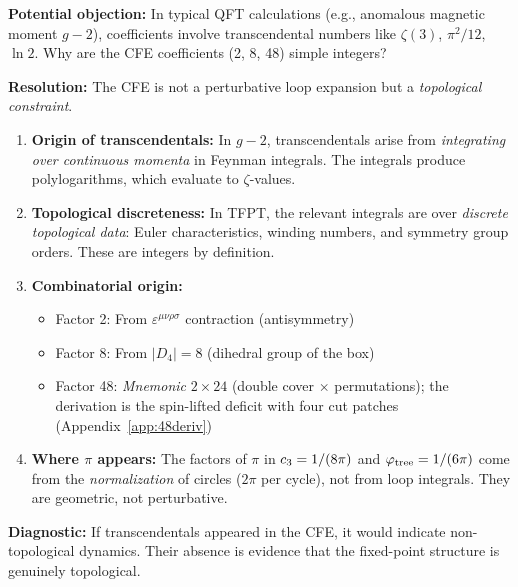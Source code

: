 \begin{tcolorbox}[colback=purple!3, colframe=purple!50!black, 
    title={\textbf{Why Integer Coefficients? (No $\zeta(3)$, $\ln 2$, etc.)}}, fonttitle=\bfseries\small]
\textbf{Potential objection:} In typical QFT calculations (e.g., anomalous magnetic moment $g-2$), 
coefficients involve transcendental numbers like $\zeta(3)$, $\pi^2/12$, $\ln 2$. Why are the 
CFE coefficients (2, 8, 48) simple integers?

\textbf{Resolution:} The CFE is not a perturbative loop expansion but a \emph{topological constraint}.

\begin{enumerate}[leftmargin=1.5em, topsep=2pt, itemsep=1pt]
    \item \textbf{Origin of transcendentals:} In $g-2$, transcendentals arise from 
        \emph{integrating over continuous momenta} in Feynman integrals. The integrals 
        produce polylogarithms, which evaluate to $\zeta$-values.
    
    \item \textbf{Topological discreteness:} In TFPT, the relevant integrals are over 
        \emph{discrete topological data}: Euler characteristics, winding numbers, and 
        symmetry group orders. These are integers by definition.
    
    \item \textbf{Combinatorial origin:}
        \begin{itemize}[leftmargin=1em, topsep=1pt, itemsep=1pt]
            \item Factor 2: From $\varepsilon^{\mu\nu\rho\sigma}$ contraction (antisymmetry)
            \item Factor 8: From $|D_4| = 8$ (dihedral group of the box)
            \item Factor 48: \emph{Mnemonic} $2 \times 24$ (double cover $\times$ permutations); the derivation is the spin-lifted deficit with four cut patches (Appendix~\ref{app:48deriv})
        \end{itemize}
    
    \item \textbf{Where $\pi$ appears:} The factors of $\pi$ in $c_3 = 1/(8\pi)$ and 
        $\varphi_{\mathrm{tree}} = 1/(6\pi)$ come from the \emph{normalization} of circles ($2\pi$ per cycle), 
        not from loop integrals. They are geometric, not perturbative.
\end{enumerate}

\textbf{Diagnostic:} If transcendentals appeared in the CFE, it would indicate non-topological 
dynamics. Their absence is evidence that the fixed-point structure is genuinely topological.
\end{tcolorbox}

